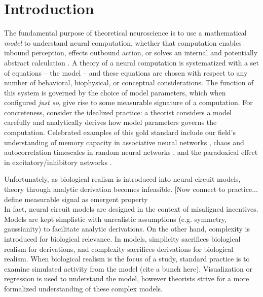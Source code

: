 \documentclass[11pt]{article}
\begin{document}
\section{Introduction}

The fundamental purpose of theoretical neuroscience is to use a mathematical \emph{model} to understand neural computation, whether that computation enables inbound perception, effects outbound action, or solves an internal and potentially abstract calculation \cite{abbott2008theoretical}.  A theory of a neural computation is systematized with a set of equations -- the model -- and these equations are chosen with respect to any number of behavioral, biophysical, or conceptual considerations.   The function of this system is governed by the choice of model parameters, which when configured \emph{just so}, give rise to some measurable signature of a computation.  For concreteness, consider the idealized practice: a theorist considers a model carefully and analytically derives how model parameters governs the computation.  Celebrated examples of this gold standard include our field's understanding of memory capacity in associative neural networks  \cite{hopfield1984neurons}, chaos and autocorrelation timescales in random neural networks \cite{sompolinsky1988chaos}, and the paradoxical effect in excitatory/inhibitory networks \cite{tsodyks1997paradoxical}.  

Unfortunately, as biological realism is introduced into neural circuit models, theory through analytic derivation becomes infeasible. [Now connect to practice... define measurable signal as emergent property\\

In fact, neural circuit models are designed in the context of misaligned incentives.  Models are kept simplistic with unrealistic assumptions (e.g. symmetry, gaussianity) to facilitate analytic derivations.  On the other hand, complexity is introduced for biological relevance. In models, simplicity sacrifices biological realism for derivations, and complexity sacrifices derivations for biological realism. When biological realism is the focus of a study, standard practice is to examine simulated activity from the model \cite{gutierrez2013multiple} (cite a bunch here).  Visualization or regression is used to understand the model, however theorists strive for a more formalized understanding of these complex models. \\
\end{document}
